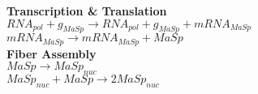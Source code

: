\documentclass[11pt, oneside]{article}   	%
\begin{document}
\begin{center}

\textbf{Transcription \& Translation} \\
$RNA_{pol} + g_{MaSp} \rightarrow RNA_{pol} + g_{MaSp} + mRNA_{MaSp}$ \\
$mRNA_{MaSp} \rightarrow mRNA_{MaSp} + MaSp$ \\
\hfill \break
\textbf{Fiber Assembly} \\
$MaSp \rightarrow MaSp_{nuc}$ \\
$MaSp_{nuc} + MaSp \rightarrow 2 MaSp_{nuc}$ \\



\end{center}
\end{document}
